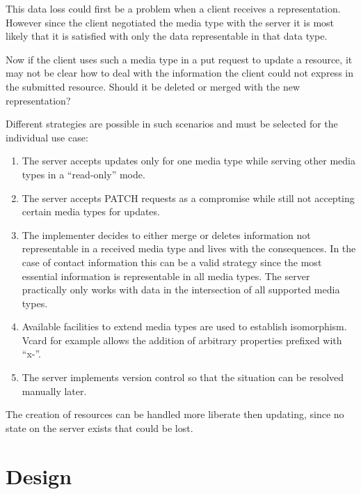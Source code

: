 \documentclass[12pt,a4paper]{scrartcl}		%
\begin{document}
This data loss could first be a problem when a client receives a
representation. However since the client negotiated the media type with the
server it is most likely that it is satisfied with only the data representable
in that data type.

Now if the client uses such a media type in a put request to update a resource,
it may not be clear how to deal with the information the client could not
express in the submitted resource. Should it be deleted or merged with the new
representation?

Different strategies are possible in such scenarios and must be selected for the
individual use case:

\begin{enumerate}
\item The server accepts updates only for one media type while serving other
  media types in a ``read-only'' mode.
\item The server accepts PATCH requests\cite{RFC5789} as a compromise while
  still not accepting certain media types for updates.
\item The implementer decides to either merge or deletes information not
  representable in a received media type and lives with the consequences. In the
  case of contact information this can be a valid strategy since the most
  essential information is representable in all media types. The server
  practically only works with data in the intersection of all supported media
  types.
\item Available facilities to extend media types are used to establish
  isomorphism. Vcard for example allows the addition of arbitrary properties
  prefixed with ``x-''.
\item The server implements version control so that the situation can be
  resolved manually later.
\end{enumerate}

The creation of resources can be handled more liberate then updating, since no
state on the server exists that could be lost.

\section{Design}


\end{document}
